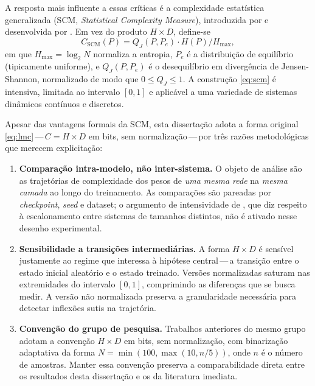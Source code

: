 A resposta mais influente a essas críticas é a complexidade
estatística generalizada (SCM, \emph{Statistical Complexity
Measure}), introduzida por  e desenvolvida
por . Em vez do produto $H \times D$, define-se
\begin{equation}
  C_{\mathrm{SCM}}(P) = Q_J(P, P_e) \cdot H(P) / H_{\max},
  \label{eq:scm}
\end{equation}
em que $H_{\max} = \log_2 N$ normaliza a entropia, $P_e$ é a
distribuição de equilíbrio (tipicamente uniforme), e $Q_J(P, P_e)$ é
o desequilíbrio em divergência de Jensen-Shannon, normalizado de modo
que $0 \le Q_J \le 1$. A construção \autoref{eq:scm} é intensiva,
limitada ao intervalo $[0, 1]$ e aplicável a uma variedade de
sistemas dinâmicos contínuos e discretos.

Apesar das vantagens formais da SCM, esta dissertação adota a forma
original \autoref{eq:lmc}\,---\,$C = H \times D$ em bits, sem
normalização\,---\,por três razões metodológicas que merecem
explicitação:

\begin{enumerate}
  \item \textbf{Comparação intra-modelo, não inter-sistema.} O objeto
        de análise são as trajetórias de complexidade dos pesos de
        \emph{uma mesma rede} na \emph{mesma camada} ao
        longo do treinamento. As comparações são pareadas por
        \emph{checkpoint}, \emph{seed} e dataset; o argumento de
        intensividade de , que diz respeito
        à escalonamento entre sistemas de tamanhos distintos, não é
        ativado nesse desenho experimental.
  \item \textbf{Sensibilidade a transições intermediárias.} A forma
        $H \times D$ é sensível justamente ao regime que interessa à
        hipótese central\,---\,a transição entre o estado inicial
        aleatório e o estado treinado. Versões normalizadas saturam
        nas extremidades do intervalo $[0, 1]$, comprimindo as
        diferenças que se busca medir. A versão não normalizada
        preserva a granularidade necessária para detectar inflexões
        sutis na trajetória.
  \item \textbf{Convenção do grupo de pesquisa.} Trabalhos anteriores
        do mesmo grupo \cite{silva2016,silva2012qsampen} adotam a
        convenção $H \times D$ em bits, sem normalização, com
        binarização adaptativa da forma $N = \min(100, \max(10,
        n/5))$, onde $n$ é o número de amostras. Manter essa
        convenção preserva a comparabilidade direta entre os
        resultados desta dissertação e os da literatura imediata.
\end{enumerate}

